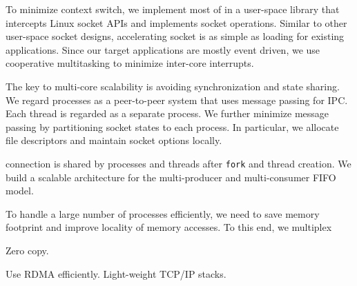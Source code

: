 To minimize context switch, we implement most of \sys{} in a user-space library \libipc{} that intercepts Linux socket APIs and implements socket operations. Similar to other user-space socket designs, accelerating socket is as simple as loading \libipc{} for existing applications. Since our target applications are mostly event driven, we use cooperative multitasking to minimize inter-core interrupts.

The key to multi-core scalability is avoiding synchronization and state sharing. We regard processes as a peer-to-peer system that uses message passing for IPC. Each thread is regarded as a separate process. We further minimize message passing by partitioning socket states to each process. In particular, we allocate file descriptors and maintain socket options locally. 

connection is shared by processes and threads after \texttt{fork} and thread creation. We build a scalable architecture for the multi-producer and multi-consumer FIFO model.

To handle a large number of processes efficiently, we need to save memory footprint and improve locality of memory accesses. To this end, we multiplex

Zero copy.

Use RDMA efficiently. Light-weight TCP/IP stacks.
